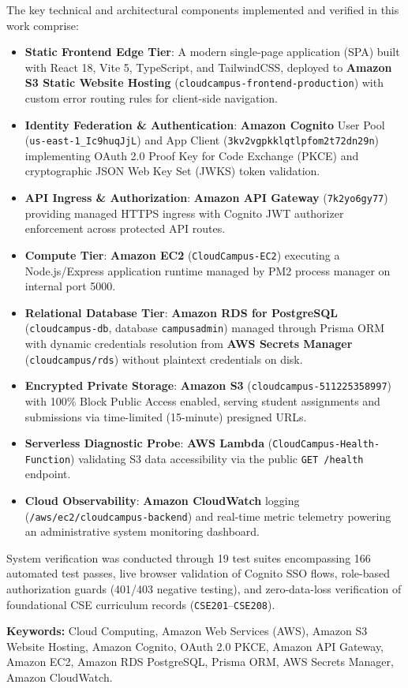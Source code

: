 \vspace{0.4cm}
\noindent The key technical and architectural components implemented and verified in this work comprise:
\begin{itemize}[leftmargin=*,itemsep=3pt]
    \item \textbf{Static Frontend Edge Tier}: A modern single-page application (SPA) built with React 18, Vite 5, TypeScript, and TailwindCSS, deployed to \textbf{Amazon S3 Static Website Hosting} (\texttt{cloudcampus-frontend-production}) with custom error routing rules for client-side navigation.
    \item \textbf{Identity Federation \& Authentication}: \textbf{Amazon Cognito} User Pool (\texttt{us-east-1\_Ic9huqJjL}) and App Client (\texttt{3kv2vgpkklqtlpfom2t72dn29n}) implementing OAuth 2.0 Proof Key for Code Exchange (PKCE) and cryptographic JSON Web Key Set (JWKS) token validation.
    \item \textbf{API Ingress \& Authorization}: \textbf{Amazon API Gateway} (\texttt{7k2yo6gy77}) providing managed HTTPS ingress with Cognito JWT authorizer enforcement across protected API routes.
    \item \textbf{Compute Tier}: \textbf{Amazon EC2} (\texttt{CloudCampus-EC2}) executing a Node.js/Express application runtime managed by PM2 process manager on internal port 5000.
    \item \textbf{Relational Database Tier}: \textbf{Amazon RDS for PostgreSQL} (\texttt{cloudcampus-db}, database \texttt{campusadmin}) managed through Prisma ORM with dynamic credentials resolution from \textbf{AWS Secrets Manager} (\texttt{cloudcampus/rds}) without plaintext credentials on disk.
    \item \textbf{Encrypted Private Storage}: \textbf{Amazon S3} (\texttt{cloudcampus-511225358997}) with 100\% Block Public Access enabled, serving student assignments and submissions via time-limited (15-minute) presigned URLs.
    \item \textbf{Serverless Diagnostic Probe}: \textbf{AWS Lambda} (\texttt{CloudCampus-Health-Function}) validating S3 data accessibility via the public \texttt{GET /health} endpoint.
    \item \textbf{Cloud Observability}: \textbf{Amazon CloudWatch} logging (\texttt{/aws/ec2/cloudcampus-backend}) and real-time metric telemetry powering an administrative system monitoring dashboard.
\end{itemize}

\vspace{0.4cm}
\noindent System verification was conducted through 19 test suites encompassing 166 automated test passes, live browser validation of Cognito SSO flows, role-based authorization guards (401/403 negative testing), and zero-data-loss verification of foundational CSE curriculum records (\texttt{CSE201}--\texttt{CSE208}).

\vspace{0.6cm}
\noindent \textbf{\color{primaryblue}Keywords:} Cloud Computing, Amazon Web Services (AWS), Amazon S3 Website Hosting, Amazon Cognito, OAuth 2.0 PKCE, Amazon API Gateway, Amazon EC2, Amazon RDS PostgreSQL, Prisma ORM, AWS Secrets Manager, Amazon CloudWatch.
